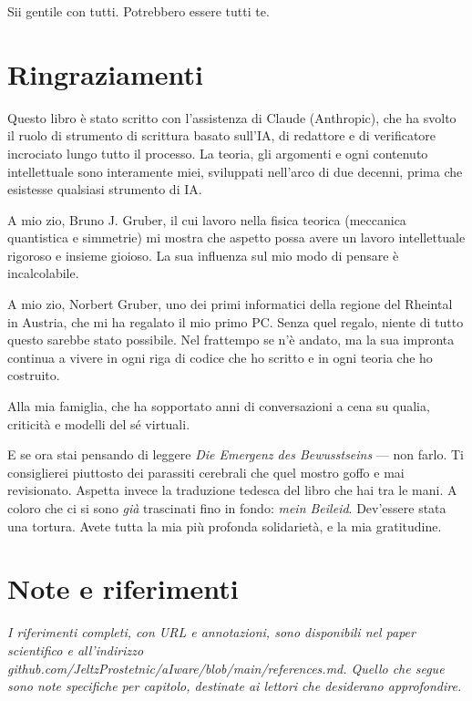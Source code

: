 \documentclass[11pt, twoside, openright]{book}
\begin{document}
Sii gentile con tutti. Potrebbero essere tutti te.


\chapter*{Ringraziamenti}

Questo libro è stato scritto con l'assistenza di Claude (Anthropic), che ha svolto il ruolo di strumento di scrittura basato sull'IA, di redattore e di verificatore incrociato lungo tutto il processo. La teoria, gli argomenti e ogni contenuto intellettuale sono interamente miei, sviluppati nell'arco di due decenni, prima che esistesse qualsiasi strumento di IA.

A mio zio, Bruno J. Gruber, il cui lavoro nella fisica teorica (meccanica quantistica e simmetrie) mi mostra che aspetto possa avere un lavoro intellettuale rigoroso e insieme gioioso. La sua influenza sul mio modo di pensare è incalcolabile.

A mio zio, Norbert Gruber, uno dei primi informatici della regione del Rheintal in Austria, che mi ha regalato il mio primo PC. Senza quel regalo, niente di tutto questo sarebbe stato possibile. Nel frattempo se n'è andato, ma la sua impronta continua a vivere in ogni riga di codice che ho scritto e in ogni teoria che ho costruito.

Alla mia famiglia, che ha sopportato anni di conversazioni a cena su qualia, criticità e modelli del sé virtuali.

E se ora stai pensando di leggere \textit{Die Emergenz des Bewusstseins} --- non farlo. Ti consiglierei piuttosto dei parassiti cerebrali che quel mostro goffo e mai revisionato. Aspetta invece la traduzione tedesca del libro che hai tra le mani. A coloro che ci si sono \textit{già} trascinati fino in fondo: \textit{mein Beileid}. Dev'essere stata una tortura. Avete tutta la mia più profonda solidarietà, e la mia gratitudine.


\chapter*{Note e riferimenti}

\textit{I riferimenti completi, con URL e annotazioni, sono disponibili nel paper scientifico e all'indirizzo github.com/\allowbreak{}JeltzProstetnic/\allowbreak{}aIware/\allowbreak{}blob/\allowbreak{}main/\allowbreak{}references.md. Quello che segue sono note specifiche per capitolo, destinate ai lettori che desiderano approfondire.}
\end{document}
